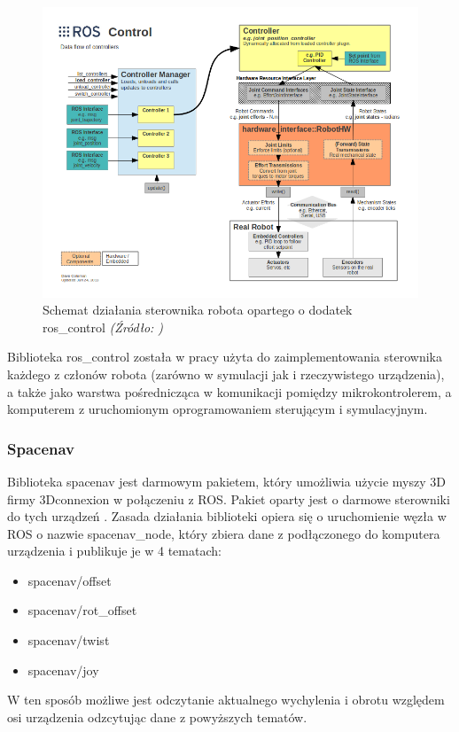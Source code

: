 \documentclass[a4paper, 12pt, twoside]{article}
\begin{document}
\begin{figure}[hbt!]
\centering
\includegraphics[width=0.8\linewidth]{images/gazebo_ros_control.png}
\caption{Schemat działania sterownika robota opartego o dodatek ros\_control \textit{ (Źródło: \cite{roscontrol}) } }
\label{fig:ros_control}
\end{figure}

Biblioteka ros\_control została w pracy użyta do zaimplementowania sterownika każdego z członów robota (zarówno w symulacji jak i rzeczywistego urządzenia), a także jako warstwa pośrednicząca w komunikacji pomiędzy mikrokontrolerem, a komputerem z uruchomionym oprogramowaniem sterującym i symulacyjnym.

\subsubsection{Spacenav}

Biblioteka spacenav \cite{spacenav} jest darmowym pakietem, który umożliwia użycie myszy 3D firmy 3Dconnexion w połączeniu z ROS. Pakiet oparty jest o darmowe sterowniki do tych urządzeń \cite{spacenavdriver}. Zasada działania biblioteki opiera się o uruchomienie węzła w ROS o nazwie spacenav\_node, który zbiera dane z podłączonego do komputera urządzenia i publikuje je w 4 tematach:

\begin{itemize}
\item spacenav/offset
\item spacenav/rot\_offset
\item spacenav/twist
\item spacenav/joy
\end{itemize}

W ten sposób możliwe jest odczytanie aktualnego wychylenia i obrotu względem osi urządzenia odzcytując dane z powyższych tematów.
\end{document}
